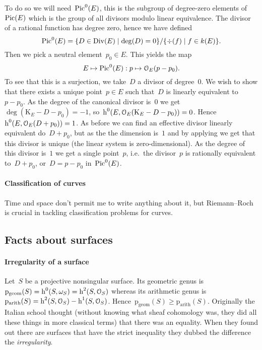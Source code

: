 \documentclass[10pt,a4paper]{article}
\begin{document}
To do so we will need~$\operatorname{Pic}^0(E)$, this is the subgroup of degree-zero elements of~$\operatorname{Pic}(E)$ which is the group of all divisors modulo linear equivalence. The divisor of a rational function has degree zero, hence we have defined
\begin{equation}
  \operatorname{Pic}^0(E)=\{D\in\operatorname{Div}(E)\mid\deg(D)=0\}/\{\div(f)\mid f\in k(E)\}.
\end{equation}
Then we pick a neutral element~$p_0\in E$. This yields the map
\begin{equation}
  E\mapsto\operatorname{Pic}^0(E):p\mapsto\mathcal{O}_E(p-p_0).
\end{equation}
To see that this is a surjection, we take~$D$ a divisor of degree~$0$. We wish to show that there exists a unique point~$p\in E$ such that~$D$ is linearly equivalent to~$p-p_0$. As the degree of the canonical divisor is~$0$ we get~$\deg(\mathrm{K}_E-D-p_0)=-1$, so~$\operatorname{h}^0(E,\mathcal{O}_E(\mathrm{K}_E-D-p_0))=0$. Hence~$\operatorname{h}^0(E,\mathcal{O}_E(D+p_0))=1$. As before we can find an effective divisor linearly equivalent do~$D+p_0$, but as the the dimension is~$1$ and by applying \cite[proposition II.7.7]{hartshorne-algebraic-geometry} we get that this divisor is unique (the linear system is zero-dimensional). As the degree of this divisor is~$1$ we get a single point~$p$, i.e.\ the divisor~$p$ is rationally equivalent to~$D+p_0$, or~$D=p-p_0$ in~$\operatorname{Pic}^0(E)$.

\paragraph{Classification of curves}
Time and space don't permit me to write anything about it, but Riemann--Roch is crucial in tackling classification problems for curves.


\subsection{Facts about surfaces}
\label{subsection:facts-surfaces}
\paragraph{Irregularity of a surface}
Let~$S$ be a projective nonsingular surface. Its geometric genus is~$\mathrm{p}_{\mathrm{geom}}(S)=\operatorname{h}^0(S,\omega_S)=\operatorname{h}^2(S,\mathcal{O}_S)$ whereas its arithmetic genus is~$\mathrm{p}_{\mathrm{arith}}(S)=\operatorname{h}^2(S,\mathcal{O}_S)-\operatorname{h}^1(S,\mathcal{O}_S)$. Hence~$\mathrm{p}_{\mathrm{geom}}(S)\geq\mathrm{p}_{\mathrm{arith}}(S)$. Originally the Italian school thought (without knowing what sheaf cohomology was, they did all these things in more classical terms) that there was an equality. When they found out there are surfaces that have the strict inequality they dubbed the difference the \emph{irregularity}.
\end{document}
